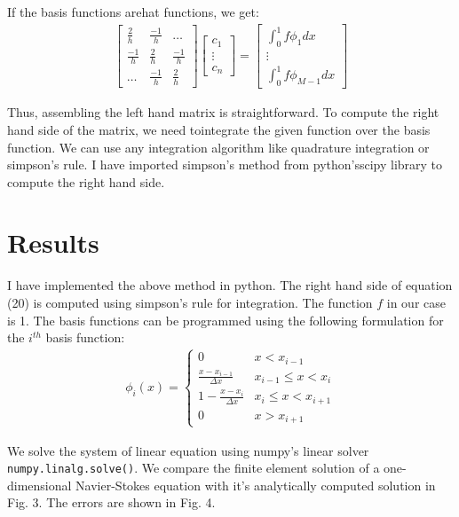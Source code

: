 \documentclass{article}
\begin{document}
If the basis functions arehat functions, we get:
\begin{align}
    \begin{bmatrix}
        \frac{2}{h} & \frac{-1}{h} & \hdots \\
        \frac{-1}{h} & \frac{2}{h} & \frac{-1}{h} \\
        \hdots & \frac{-1}{h} & \frac{2}{h}
    \end{bmatrix}
    \begin{bmatrix}
        c_1 \\
        \vdots \\
        c_n
    \end{bmatrix}
    =
    \begin{bmatrix}
        \int_0^1 f\phi_1 dx \\
        \vdots \\
        \int_0^1 f\phi_{M-1} dx
    \end{bmatrix}
\end{align}

Thus, assembling the left hand matrix is straightforward. To compute the right hand side of the matrix, we need tointegrate the given function over the basis function. We can use any integration algorithm like quadrature integration or simpson's rule. I have imported simpson's method from python'sscipy library to compute the right hand side.

\section{Results}
I have implemented the above method in python. The right hand side of equation (20) is computed using simpson's rule for integration. The function $f$ in our case is 1. The basis functions can be programmed using the following formulation for the $i^{th}$ basis function:
\begin{align}
    \phi_i(x) = \left\{
        \begin{matrix}
            0 & x < x_{i-1} \\
            \frac{x-x_{i-1}}{\Delta x} & x_{i-1} \le x < x_i \\
            1 - \frac{x - x_i}{\Delta x} & x_i \le x < x_{i+1} \\
            0 & x > x_{i+1}
        \end{matrix}
\end{align}

We solve the system of linear equation using numpy's linear solver {\tt numpy.linalg.solve()}. We compare the finite element solution of a one-dimensional Navier-Stokes equation with it's analytically computed solution in Fig. 3. The errors are shown in Fig. 4.
\end{document}
